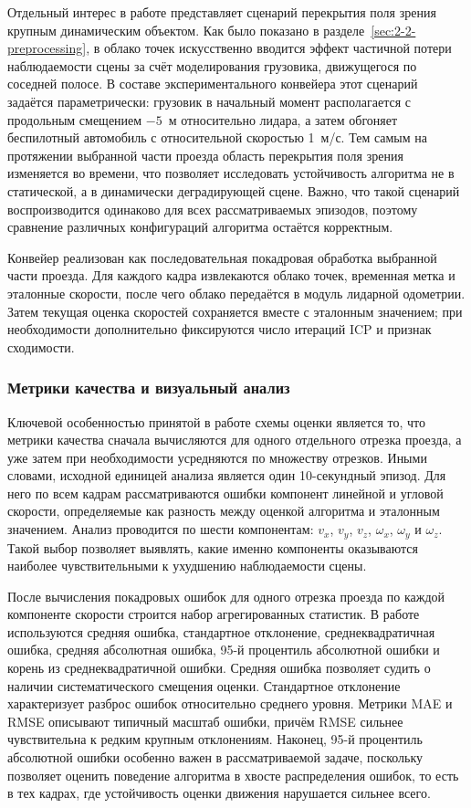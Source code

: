 Отдельный интерес в работе представляет сценарий перекрытия поля зрения крупным динамическим объектом. Как было показано в разделе~\ref{sec:2-2-preprocessing}, в облако точек искусственно вводится эффект частичной потери наблюдаемости сцены за счёт моделирования грузовика, движущегося по соседней полосе. В составе экспериментального конвейера этот сценарий задаётся параметрически: грузовик в начальный момент располагается с продольным смещением \(-5\)~м относительно лидара, а затем обгоняет беспилотный автомобиль с относительной скоростью 1~м/с. Тем самым на протяжении выбранной части проезда область перекрытия поля зрения изменяется во времени, что позволяет исследовать устойчивость алгоритма не в статической, а в динамически деградирующей сцене. Важно, что такой сценарий воспроизводится одинаково для всех рассматриваемых эпизодов, поэтому сравнение различных конфигураций алгоритма остаётся корректным.

Конвейер реализован как последовательная покадровая обработка выбранной части проезда. Для каждого кадра извлекаются облако точек, временная метка и эталонные скорости, после чего облако передаётся в модуль лидарной одометрии. Затем текущая оценка скоростей сохраняется вместе с эталонным значением; при необходимости дополнительно фиксируются число итераций ICP и признак сходимости.

\subsubsection{Метрики качества и визуальный анализ}

Ключевой особенностью принятой в работе схемы оценки является то, что метрики качества сначала вычисляются для одного отдельного отрезка проезда, а уже затем при необходимости усредняются по множеству отрезков. Иными словами, исходной единицей анализа является один 10-секундный эпизод. Для него по всем кадрам рассматриваются ошибки компонент линейной и угловой скорости, определяемые как разность между оценкой алгоритма и эталонным значением. Анализ проводится по шести компонентам: \(v_x\), \(v_y\), \(v_z\), \(\omega_x\), \(\omega_y\) и \(\omega_z\). Такой выбор позволяет выявлять, какие именно компоненты оказываются наиболее чувствительными к ухудшению наблюдаемости сцены.

После вычисления покадровых ошибок для одного отрезка проезда по каждой компоненте скорости строится набор агрегированных статистик. В работе используются средняя ошибка, стандартное отклонение, среднеквадратичная ошибка, средняя абсолютная ошибка, 95-й процентиль абсолютной ошибки и корень из среднеквадратичной ошибки. Средняя ошибка позволяет судить о наличии систематического смещения оценки. Стандартное отклонение характеризует разброс ошибок относительно среднего уровня. Метрики MAE и RMSE описывают типичный масштаб ошибки, причём RMSE сильнее чувствительна к редким крупным отклонениям. Наконец, 95-й процентиль абсолютной ошибки особенно важен в рассматриваемой задаче, поскольку позволяет оценить поведение алгоритма в хвосте распределения ошибок, то есть в тех кадрах, где устойчивость оценки движения нарушается сильнее всего.

